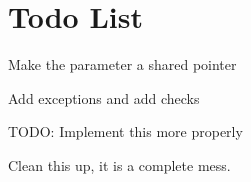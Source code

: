 \chapter{Todo List}
\hypertarget{todo}{}\label{todo}

\begin{DoxyRefList}
\item[Member \doxylink{class_atlas_1_1_component_a995c7391052db9cd22716846e0735b71}{Atlas\+::Component\+::set\+Owner} (\doxylink{class_atlas_1_1_i_game_object}{IGame\+Object} \texorpdfstring{$\ast$}{*}owner)]\label{todo__todo000001}%
%
Make the parameter a shared pointer 



Add exceptions and add checks  
\item[Member \doxylink{namespace_atlas_a2fb14e6c76bf6e577bdd65ffff7d7519}{Atlas\+::Default\+Physics\+Trace} (const char \texorpdfstring{$\ast$}{*}in\+FMT,...)]\label{todo__todo000014}%
%
TODO\+: Implement this more properly  
\item[Class \doxylink{class_atlas_1_1_file_system_registry}{Atlas\+::File\+System\+Registry} ]\label{todo__todo000007}%
%
Clean this up, it is a complete mess. 




\end{DoxyRefList}
